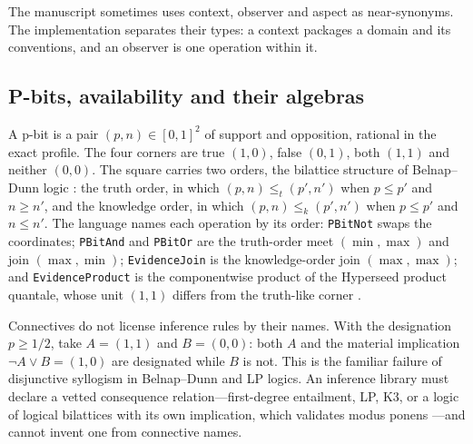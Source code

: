 \documentclass[11pt]{article}
\newcommand{\code}[1]{\texttt{#1}}
\theoremstyle{definition}
\theoremstyle{plain}
\begin{document}
The manuscript sometimes uses context, observer and aspect as near-synonyms. The implementation
separates their types: a context packages a domain and its conventions, and an observer is one
operation within it.

\subsection{P-bits, availability and their algebras}

A p-bit is a pair $(p,n)\in[0,1]^2$ of support and opposition, rational in the exact profile. The
four corners are true $(1,0)$, false $(0,1)$, both $(1,1)$ and neither $(0,0)$. The square carries
two orders, the bilattice structure of Belnap--Dunn logic \cite{belnap,ginsberg}: the truth order,
in which $(p,n)\le_t(p',n')$ when $p\le p'$ and $n\ge n'$, and the knowledge order, in which
$(p,n)\le_k(p',n')$ when $p\le p'$ and $n\le n'$. The language names each operation by its order:
\code{PBitNot} swaps the coordinates; \code{PBitAnd} and \code{PBitOr} are the truth-order meet
$(\min,\max)$ and join $(\max,\min)$; \code{EvidenceJoin} is the knowledge-order join $(\max,\max)$;
and \code{EvidenceProduct} is the componentwise product of the Hyperseed product quantale, whose unit
$(1,1)$ differs from the truth-like corner \cite{hyperseed}.

Connectives do not license inference rules by their names. With the designation $p\ge1/2$, take
$A=(1,1)$ and $B=(0,0)$: both $A$ and the material implication $\neg A\vee B=(1,0)$ are designated
while $B$ is not. This is the familiar failure of disjunctive syllogism in Belnap--Dunn and LP
logics. An inference library must declare a vetted consequence relation---first-degree entailment,
LP, K3, or a logic of logical bilattices with its own implication, which validates modus ponens
\cite{arieliavron}---and cannot invent one from connective names.
\end{document}
